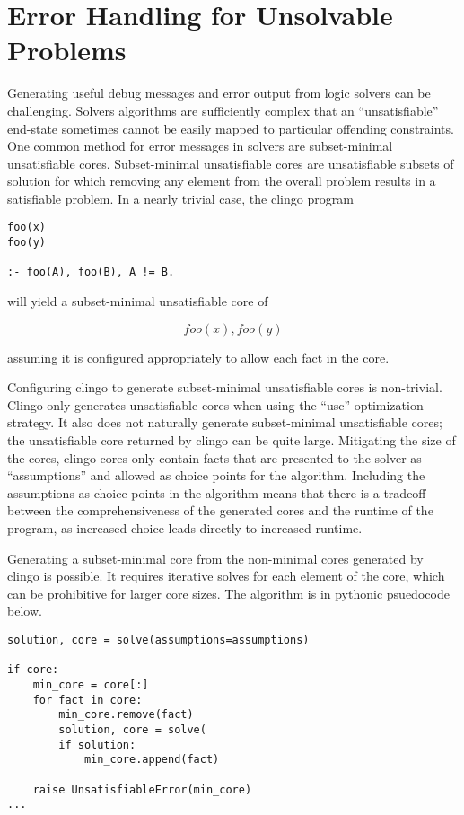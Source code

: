 \section{Error Handling for Unsolvable Problems}
\label{sec:error-handling}

Generating useful debug messages and error output from logic solvers can be challenging.
Solvers algorithms are sufficiently complex that an ``unsatisfiable'' end-state sometimes cannot be easily mapped to particular offending constraints.
One common method for error messages in solvers are subset-minimal unsatisfiable cores.
Subset-minimal unsatisfiable cores are unsatisfiable subsets of solution for which removing any element from the overall problem results in a satisfiable problem.
In a nearly trivial case, the clingo program

\begin{verbatim}
foo(x)
foo(y)

:- foo(A), foo(B), A != B.
\end{verbatim}

will yield a subset-minimal unsatisfiable core of

$$ {foo(x), foo(y)} $$

assuming it is configured appropriately to allow each fact in the core.

Configuring clingo to generate subset-minimal unsatisfiable cores is non-trivial.
Clingo only generates unsatisfiable cores when using the ``usc'' optimization strategy.
It also does not naturally generate subset-minimal unsatisfiable cores; the unsatisfiable core returned by clingo can be quite large.
Mitigating the size of the cores, clingo cores only contain facts that are presented to the solver as ``assumptions'' and allowed as choice points for the algorithm.
Including the assumptions as choice points in the algorithm means that there is a tradeoff between the comprehensiveness of the generated cores and the runtime of the program, as increased choice leads directly to increased runtime.

Generating a subset-minimal core from the non-minimal cores generated by clingo is possible.
It requires iterative solves for each element of the core, which can be prohibitive for larger core sizes.
The algorithm is in pythonic psuedocode below.

\begin{verbatim}
solution, core = solve(assumptions=assumptions)

if core:
    min_core = core[:]
    for fact in core:
        min_core.remove(fact)
        solution, core = solve(
        if solution:
            min_core.append(fact)

    raise UnsatisfiableError(min_core)
...
\end{verbatim}

